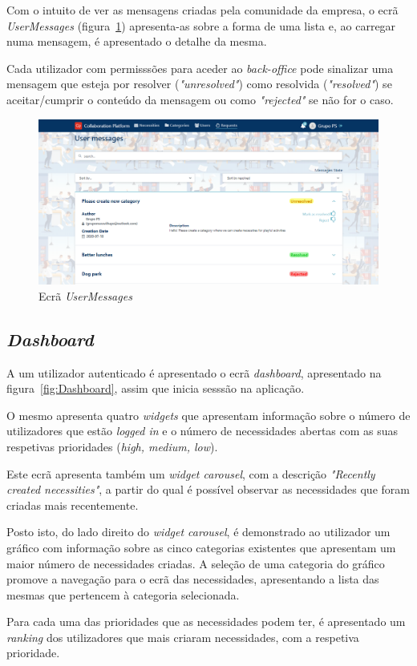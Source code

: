 Com o intuito de ver as mensagens criadas pela comunidade da empresa, o ecrã \textit{UserMessages} (figura~\ref{fig:backoffice_user_messages}) apresenta-as sobre a forma de uma lista e,
ao carregar numa mensagem, é apresentado o detalhe da mesma. 
\par
Cada utilizador com permisssões para aceder ao \textit{back-office} pode sinalizar uma mensagem que esteja por resolver (\textit{"unresolved"}) como  resolvida (\textit{"resolved"}) se aceitar/cumprir o conteúdo da mensagem ou como \textit{"rejected"} se não for o caso.  

\begin{figure}[H]
  \centering 
  \includegraphics[scale=0.35]{figures/backoffice_userMessages.png}
  \caption{Ecrã \textit{UserMessages}}\label{fig:backoffice_user_messages}
\end{figure}

\newpage

\subsection{\textit{Dashboard}}\label{subsec:implementacao:dashboard}

A um utilizador autenticado é apresentado o ecrã \textit{dashboard}, apresentado na figura~\ref{fig:Dashboard}, assim que inicia sesssão na aplicação.
\par
O mesmo apresenta quatro \textit{widgets} que apresentam informação sobre o número de utilizadores que estão \textit{logged in} e o número de necessidades abertas com as suas respetivas prioridades (\textit{high, medium, low}).
\par
Este ecrã apresenta também um \textit{widget carousel}, com a descrição \textit{"Recently created necessities"}, a partir do qual é possível observar as necessidades que foram criadas mais recentemente. 
\par
Posto isto, do lado direito do \textit{widget carousel}, é demonstrado ao utilizador um gráfico com informação sobre as cinco categorias existentes que apresentam um maior número de necessidades criadas.
A seleção de uma categoria do gráfico promove a navegação para o ecrã das necessidades,  apresentando a lista das mesmas que pertencem à categoria selecionada.
\par
Para cada uma das prioridades que as necessidades podem ter, é apresentado um \textit{ranking} dos utilizadores que mais criaram necessidades, com a respetiva prioridade.

